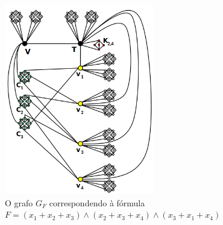 \begin{figure}[htb]	
\center%
\includegraphics[width=6.5cm]{./img/exemploGrafoGFSBPO4.png}
\caption{O grafo $G_{F}$ correspondendo à fórmula $F=(x_1+ x_2+ x_3) \wedge  (x_2+ x_3+ x_4 )\wedge  (x_3 + x_1 + x_4 )$}
\label{fig:exemploGrafoGF}
\end{figure}